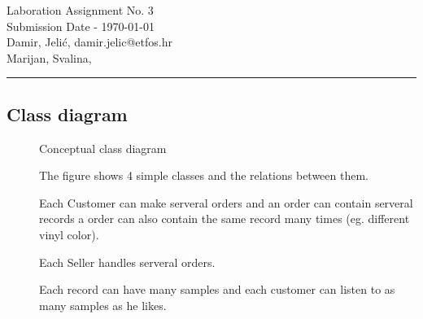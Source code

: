 \documentclass[11pt,a4paper]{article}
\begin{document}
\large
Laboration Assignment No. 3\\
Submission Date - \yyyymmdddate \today \\
Damir, Jelić, damir.jelic@etfos.hr \\
Marijan, Svalina, %
\\
\rule{\linewidth}{0.1mm}

\setcounter{section}{3}
\subsection{Class diagram}
\begin{figure}[htb]
    \begin{center}
        \setlength\fboxsep{0pt}
    \end{center}
    \caption{Conceptual class diagram}
    \label{fig:class_diag}
\end{figure}
\begin{description}
    \item[]
        The figure shows 4 simple classes and the relations between them.
    \item[]
        Each Customer can make serveral orders and an order can contain serveral
        records a order can also contain the same record many times (eg. different vinyl color).
    \item[]
        Each Seller handles serveral orders.
    \item[]
        Each record can have many samples and each customer can 
        listen to as many samples as he likes.
\end{description}

\newpage
\end{document}

